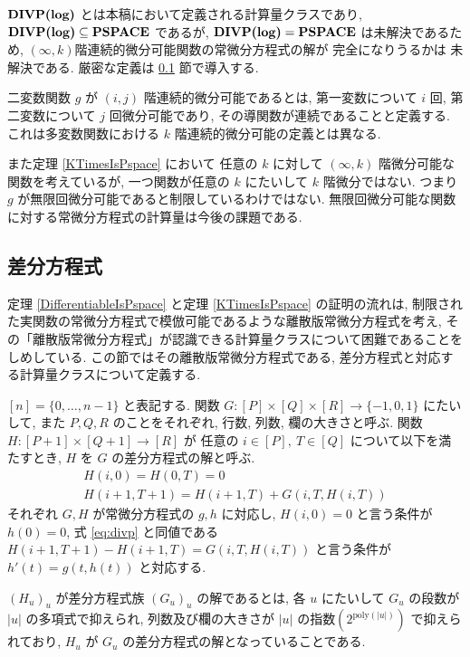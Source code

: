  $\text{\bf DIVP(log)}$ とは本稿において定義される計算量クラスであり,
 $\text{\bf DIVP(log)} \subseteq {\bf PSPACE}$ であるが, $\text{\bf DIVP(log)} = {\bf PSPACE}$ は未解決であるため,
 $(\infty, k)$階連続的微分可能関数の常微分方程式の解が \PSPACE 完全になりうるかは
 未解決である.
 厳密な定義は \ref{section:divp} 節で導入する.

 二変数関数 $g$ が $(i, j)$ 階連続的微分可能であるとは,
 第一変数について $i$ 回, 第二変数について $j$ 回微分可能であり,
 その導関数が連続であることと定義する.
 これは多変数関数における $k$ 階連続的微分可能の定義とは異なる.

また定理 \ref{KTimesIsPspace} において
任意の $k$ に対して $(\infty, k)$ 階微分可能な関数を考えているが,
一つ関数が任意の $k$ にたいして $k$ 階微分ではない.
つまり $g$ が無限回微分可能であると制限しているわけではない. 
無限回微分可能な関数に対する常微分方程式の計算量は今後の課題である.





\subsection{差分方程式}
\label{section:divp}

定理 \ref{DifferentiableIsPspace} と定理 \ref{KTimesIsPspace} の証明の流れは,
制限された実関数の常微分方程式で模倣可能であるような離散版常微分方程式を考え, 
その「離散版常微分方程式」が認識できる計算量クラスについて困難であることをしめしている.
この節ではその離散版常微分方程式である, 差分方程式と対応する計算量クラスについて定義する.


$[n] = \{0, \dots , n-1\}$ と表記する.
関数 $G \colon [P] \times [Q] \times [R] \to \{-1, 0, 1\}$ にたいして,
また $P, Q, R$ のことをそれぞれ, 行数, 列数, 欄の大きさと呼ぶ.
関数 $H \colon [P + 1] \times [Q+1] \to [R]$ が
任意の $i \in [P],\ T \in [Q]$ について以下を満たすとき,
$H$ を $G$ の差分方程式の解と呼ぶ.
\begin{gather}
   H(i, 0) = H(0, T) = 0 
\\
   H(i + 1, T + 1) = H(i+1, T) + G(i, T, H(i, T))  \label{eq:divp}
\end{gather}
それぞれ $G, H$ が常微分方程式の $g, h$ に対応し,
$H(i, 0) = 0$ と言う条件が $h(0) = 0$,
式 \ref{eq:divp} と同値である $H(i + 1, T + 1) - H(i+1, T) = G(i, T, H(i, T))$
と言う条件が $h'(t) = g(t, h(t))$ と対応する.


 $(H_u)_u$ が差分方程式族 $(G_u)_u$ の解であるとは,
 各 $u$ にたいして $G_u$ の段数が $|u|$ の多項式で抑えられ, 
 列数及び欄の大きさが $|u|$ の指数$(2^{\mathrm{poly} (|u|)})$ で抑えられており,
 $H_u$ が $G_u$ の差分方程式の解となっていることである.

